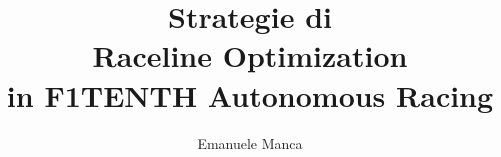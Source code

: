 \documentclass[12pt,a4paper]{report}
\title{Strategie di\\Raceline Optimization\\in F1TENTH Autonomous Racing}
\author{Emanuele Manca}
\begin{document}
\makefrontpage
\afterpreface
\newpage







\printbibliography
\end{document}
